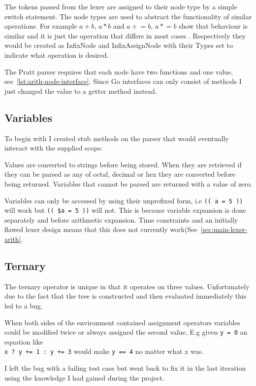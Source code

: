 The tokens passed from the lexer are assigned to their node type by a simple switch statement.
The node types are used to abstract the functionality of similar operations.
For example $a + b$, $a * b$ and $a \mathrel{+}= b$, $a \mathrel{*}= b$ show that behaviour is similar and it is just the operation that differs in most cases .
Respectively they would be created as InfixNode and InfixAssignNode with their Types set to indicate what operation is desired.

The Pratt parser requires that each node have two functions and one value, see~\ref{lst:arith-node-interface}.
Since Go interfaces can only consist of methods I just changed the value to a getter method instead.

\subsection{Variables}
To begin with I created stub methods on the parser that would eventually interact with the supplied scope.

Values are converted to strings before being stored.
When they are retrieved if they can be parsed as any of octal, decimal or hex they are converted before being returned.
Variables that cannot be parsed are returned with a value of zero.

Variables can only be accessed by using their unprefixed form, i.e \verb!(( a = 5 ))! will work but \verb!(( $a = 5 ))! will not.
This is because variable expansion is done separately and before arithmetic expansion.
Time constraints and an initially flawed lexer design means that this does not currently work(See~\ref{sec:main-lexer-arith}.

\subsection{Ternary}
The ternary operator is unique in that it operates on three values.
Unfortunately due to the fact that the tree is constructed and then evaluated immediately this led to a bug.

When both sides of the environment contained assignment operators variables could be modified twice or always assigned the second value, E.g given \verb!y = 0! an equation like \\ \verb!x ? y += 1 : y += 3! would make \verb!y == 4! no matter what x was.

I left the bug with a failing test case but went back to fix it in the last iteration using the knowledge I had gained during the project.